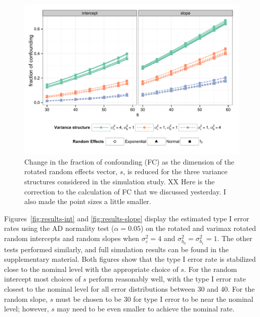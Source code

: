 \documentclass[12pt]{article} %
\newcommand{\al}[1]{{\color{red} #1}}
\begin{document}
\begin{figure}[h]
	\centering
	\includegraphics[width=\textwidth]{fc_by_s_trial.pdf}
	\caption{\label{fig:fc} Change in the fraction of confounding (FC) as the dimension of the rotated random effects vector, $s$, is reduced for the three variance structures considered in the simulation study. %
	\al{XX Here is the correction to the calculation of FC that we discussed yesterday. I also made the point sizes a little smaller.}
	}
\end{figure}

Figures~\ref{fig:results-int} and \ref{fig:results-slope} display the estimated type I error rates using the AD normality test ($\alpha = 0.05$) on the rotated and varimax rotated random intercepts and random slopes when $\sigma^2_\varepsilon = 4$ and $\sigma^2_{b_0} = \sigma^2_{b_1} = 1$. The other tests performed similarly, and full simulation results can be found in the supplementary material. Both figures show that the type I error rate is stabilized close to the nominal level with the appropriate choice of $s$. For the random intercept most choices of $s$ perform reasonably well, with the type I error rate closest to the nominal level for all error distributions between 30 and 40. For the random slope, $s$ must be chosen to be 30 for type I error to be near the nominal level; however, $s$ may need to be even smaller to achieve the nominal rate. 


\end{document}
